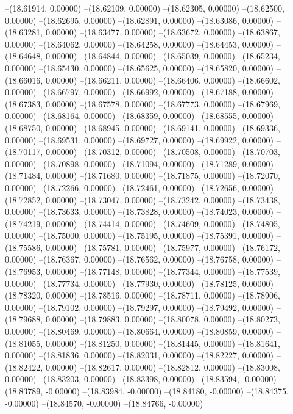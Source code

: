 --(18.61914, 0.00000)
--(18.62109, 0.00000)
--(18.62305, 0.00000)
--(18.62500, 0.00000)
--(18.62695, 0.00000)
--(18.62891, 0.00000)
--(18.63086, 0.00000)
--(18.63281, 0.00000)
--(18.63477, 0.00000)
--(18.63672, 0.00000)
--(18.63867, 0.00000)
--(18.64062, 0.00000)
--(18.64258, 0.00000)
--(18.64453, 0.00000)
--(18.64648, 0.00000)
--(18.64844, 0.00000)
--(18.65039, 0.00000)
--(18.65234, 0.00000)
--(18.65430, 0.00000)
--(18.65625, 0.00000)
--(18.65820, 0.00000)
--(18.66016, 0.00000)
--(18.66211, 0.00000)
--(18.66406, 0.00000)
--(18.66602, 0.00000)
--(18.66797, 0.00000)
--(18.66992, 0.00000)
--(18.67188, 0.00000)
--(18.67383, 0.00000)
--(18.67578, 0.00000)
--(18.67773, 0.00000)
--(18.67969, 0.00000)
--(18.68164, 0.00000)
--(18.68359, 0.00000)
--(18.68555, 0.00000)
--(18.68750, 0.00000)
--(18.68945, 0.00000)
--(18.69141, 0.00000)
--(18.69336, 0.00000)
--(18.69531, 0.00000)
--(18.69727, 0.00000)
--(18.69922, 0.00000)
--(18.70117, 0.00000)
--(18.70312, 0.00000)
--(18.70508, 0.00000)
--(18.70703, 0.00000)
--(18.70898, 0.00000)
--(18.71094, 0.00000)
--(18.71289, 0.00000)
--(18.71484, 0.00000)
--(18.71680, 0.00000)
--(18.71875, 0.00000)
--(18.72070, 0.00000)
--(18.72266, 0.00000)
--(18.72461, 0.00000)
--(18.72656, 0.00000)
--(18.72852, 0.00000)
--(18.73047, 0.00000)
--(18.73242, 0.00000)
--(18.73438, 0.00000)
--(18.73633, 0.00000)
--(18.73828, 0.00000)
--(18.74023, 0.00000)
--(18.74219, 0.00000)
--(18.74414, 0.00000)
--(18.74609, 0.00000)
--(18.74805, 0.00000)
--(18.75000, 0.00000)
--(18.75195, 0.00000)
--(18.75391, 0.00000)
--(18.75586, 0.00000)
--(18.75781, 0.00000)
--(18.75977, 0.00000)
--(18.76172, 0.00000)
--(18.76367, 0.00000)
--(18.76562, 0.00000)
--(18.76758, 0.00000)
--(18.76953, 0.00000)
--(18.77148, 0.00000)
--(18.77344, 0.00000)
--(18.77539, 0.00000)
--(18.77734, 0.00000)
--(18.77930, 0.00000)
--(18.78125, 0.00000)
--(18.78320, 0.00000)
--(18.78516, 0.00000)
--(18.78711, 0.00000)
--(18.78906, 0.00000)
--(18.79102, 0.00000)
--(18.79297, 0.00000)
--(18.79492, 0.00000)
--(18.79688, 0.00000)
--(18.79883, 0.00000)
--(18.80078, 0.00000)
--(18.80273, 0.00000)
--(18.80469, 0.00000)
--(18.80664, 0.00000)
--(18.80859, 0.00000)
--(18.81055, 0.00000)
--(18.81250, 0.00000)
--(18.81445, 0.00000)
--(18.81641, 0.00000)
--(18.81836, 0.00000)
--(18.82031, 0.00000)
--(18.82227, 0.00000)
--(18.82422, 0.00000)
--(18.82617, 0.00000)
--(18.82812, 0.00000)
--(18.83008, 0.00000)
--(18.83203, 0.00000)
--(18.83398, 0.00000)
--(18.83594, -0.00000)
--(18.83789, -0.00000)
--(18.83984, -0.00000)
--(18.84180, -0.00000)
--(18.84375, -0.00000)
--(18.84570, -0.00000)
--(18.84766, -0.00000)

